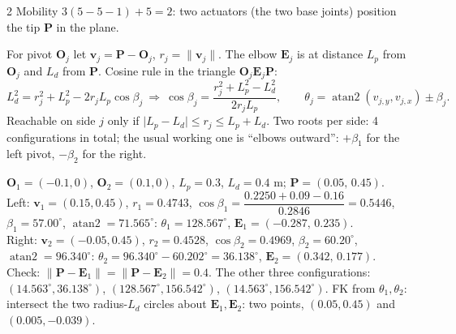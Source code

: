 \begin{multicols}{2}
Mobility $3(5-5-1)+5=2$: two actuators (the two base joints) position the tip $\mathbf P$ in the plane. 
\begin{deriv}
For pivot $\mathbf O_j$ let $\mathbf v_j=\mathbf P-\mathbf O_j$, $r_j=\lVert\mathbf v_j\rVert$. The elbow $\mathbf E_j$ is at distance $L_p$ from $\mathbf O_j$ and $L_d$ from $\mathbf P$. Cosine rule in the triangle $\mathbf O_j\mathbf E_j\mathbf P$:
\[L_d^2=r_j^2+L_p^2-2r_jL_p\cos\beta_j\ \Rightarrow\ \cos\beta_j=\frac{r_j^2+L_p^2-L_d^2}{2r_jL_p},\qquad\theta_j=\operatorname{atan2}(v_{j,y},v_{j,x})\pm\beta_j.\]
Reachable on side $j$ only if $\lvert L_p-L_d\rvert\le r_j\le L_p+L_d$. Two roots per side: 4 configurations in total; the usual working one is ``elbows outward'': $+\beta_1$ for the left pivot, $-\beta_2$ for the right.
\end{deriv}
\begin{worked}
$\mathbf O_1=(-0.1,0)$, $\mathbf O_2=(0.1,0)$, $L_p=0.3$, $L_d=0.4$ m; $\mathbf P=(0.05,\,0.45)$.\\
Left: $\mathbf v_1=(0.15,0.45)$, $r_1=0.4743$, $\cos\beta_1=\dfrac{0.2250+0.09-0.16}{0.2846}=0.5446$, $\beta_1=57.00^\circ$, $\operatorname{atan2}=71.565^\circ$: $\theta_1=128.567^\circ$, $\mathbf E_1=(-0.287,\,0.235)$.\\
Right: $\mathbf v_2=(-0.05,0.45)$, $r_2=0.4528$, $\cos\beta_2=0.4969$, $\beta_2=60.20^\circ$, $\operatorname{atan2}=96.340^\circ$: $\theta_2=96.340^\circ-60.202^\circ=36.138^\circ$, $\mathbf E_2=(0.342,\,0.177)$.\\
Check: $\lVert\mathbf P-\mathbf E_1\rVert=\lVert\mathbf P-\mathbf E_2\rVert=0.4$. The other three configurations: $(14.563^\circ,36.138^\circ)$, $(128.567^\circ,156.542^\circ)$, $(14.563^\circ,156.542^\circ)$. FK from $\theta_1,\theta_2$: intersect the two radius-$L_d$ circles about $\mathbf E_1,\mathbf E_2$: two points, $(0.05,0.45)$ and $(0.005,-0.039)$. \chk
\end{worked}
\begin{center}
\end{center}
\end{multicols}
